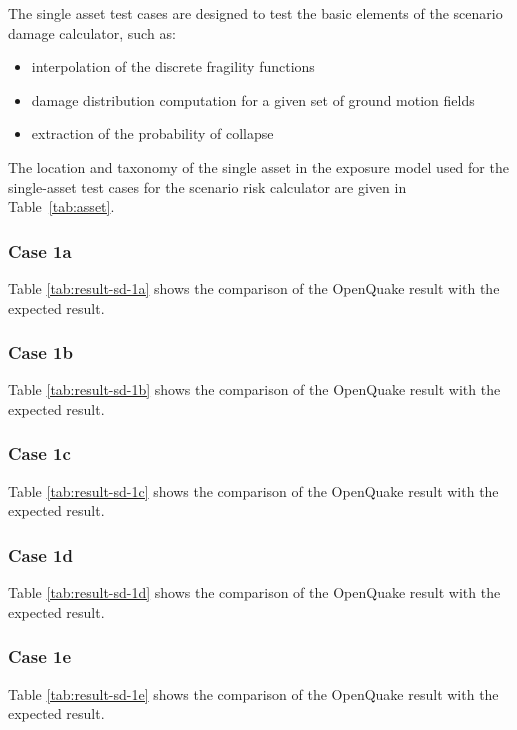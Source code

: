 The single asset test cases are designed to test the basic elements of the scenario damage calculator, such as:

\begin{itemize}
\item interpolation of the discrete fragility functions
\item damage distribution computation for a given set of ground motion fields
\item extraction of the probability of collapse
\end{itemize}

The location and taxonomy of the single asset in the exposure model used for the single-asset test cases for the scenario risk calculator are given in Table~\ref{tab:asset}.

\subsubsection{Case 1a}


Table \ref{tab:result-sd-1a} shows the comparison of the OpenQuake result with the expected result.

\subsubsection{Case 1b}


Table \ref{tab:result-sd-1b} shows the comparison of the OpenQuake result with the expected result.

\subsubsection{Case 1c}


Table \ref{tab:result-sd-1c} shows the comparison of the OpenQuake result with the expected result.

\subsubsection{Case 1d}


Table \ref{tab:result-sd-1d} shows the comparison of the OpenQuake result with the expected result.
\subsubsection{Case 1e}


Table \ref{tab:result-sd-1e} shows the comparison of the OpenQuake result with the expected result.
